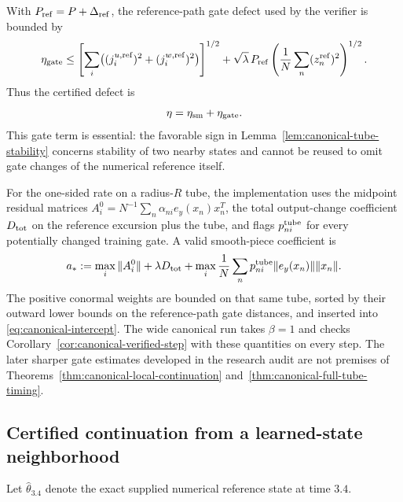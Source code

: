 \documentclass[10pt]{article}
\theoremstyle{remark}\newtheorem{remark}[theorem]{Remark}
\begin{document}
With $P_{\rm ref}=P+\Delta_{\rm ref}$, the reference-path gate defect used
by the verifier is bounded by
\begin{equation}
 \eta_{\rm gate}\le
 \left[\sum_i\bigl((j_i^{u,{\rm ref}})^2+(j_i^{w,{\rm ref}})^2\bigr)\right]^{1/2}
 +\sqrt\lambda\,P_{\rm ref}
   \left(\frac1N\sum_n(z_n^{\rm ref})^2\right)^{1/2}.
 \label{eq:canonical-gate-defect}
\end{equation}
Thus the certified defect is
\begin{equation}
 \eta=\eta_{\rm sm}+\eta_{\rm gate}.
 \label{eq:canonical-total-defect}
\end{equation}
This gate term is essential: the favorable sign in
Lemma~\ref{lem:canonical-tube-stability} concerns stability of two nearby
states and cannot be reused to omit gate changes of the numerical reference
itself.

For the one-sided rate on a radius-$R$ tube, the implementation uses the
midpoint residual matrices
$A_i^0=N^{-1}\sum_n\alpha_{ni}e_y(x_n)x_n^T$, the total output-change coefficient
$D_{\rm tot}$ on the reference excursion plus the tube, and flags
$p_{ni}^{\rm tube}$ for every potentially changed training gate. A valid
smooth-piece coefficient is
\begin{equation}
 a_*:=\max_i\|A_i^0\|+\lambda D_{\rm tot}
 +\max_i\frac1N\sum_n p_{ni}^{\rm tube}
       \|e_y(x_n)\|\|x_n\|.
 \label{eq:canonical-rate-instantiation}
\end{equation}
The positive conormal weights are bounded on that same tube, sorted by their
outward lower bounds on the reference-path gate distances, and inserted into
\eqref{eq:canonical-intercept}. The wide canonical run takes $\beta=1$ and
checks Corollary~\ref{cor:canonical-verified-step} with these quantities on
every step. The later sharper gate estimates developed in the research audit
are not premises of Theorems~\ref{thm:canonical-local-continuation}
and~\ref{thm:canonical-full-tube-timing}.

\subsection{Certified continuation from a learned-state neighborhood}

Let $\widehat\theta_{3.4}$ denote the exact supplied numerical reference
state at time $3.4$.
\end{document}
